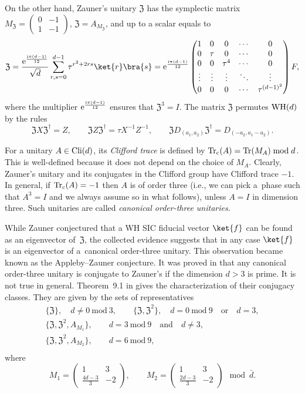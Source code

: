 \documentclass[pdftex]{sigma}
\numberwithin{equation}{section}
\newcommand{\mmod}{\mathrm{~mod~}}
\newcommand{\bmp}{\begin{pmatrix}}
\newcommand{\emp}{\end{pmatrix}}
\DeclareMathOperator{\tr}{Tr}
\begin{document}
On the other hand, Zauner's unitary $\mathfrak{Z}$ has the symplectic matrix
$M_\mathfrak{Z} = \left(\begin{smallmatrix} 0 & -1 \\ 1 & -1 \end{smallmatrix}\right)$, $\mathfrak{Z} = A_{M_\mathfrak{Z}}$,
and up to a scalar equals to
\[
\mathfrak{Z} = \frac{{\rm e}^{\frac{{\rm i}\pi (d-1)}{12}}}{\sqrt{d}} \sum_{r,s=0}^{d-1} \tau^{r^2+2rs}\ket{r}\bra{s}
= {\rm e}^{\frac{{\rm i}\pi (d-1)}{12}}\bmp
1 & 0 & 0 & \cdots & 0\\
0 & \tau & 0 & \cdots & 0\\
0 & 0 & \tau^4 & \cdots & 0\\
\vdots & \vdots & \vdots & \ddots & \vdots\\
0 & 0 & 0 & \cdots & \tau^{(d-1)^2}\\
\emp F,
\]
where the multiplier ${\rm e}^{\frac{{\rm i}\pi (d-1)}{12}}$ ensures that $\mathfrak{Z}^3 = I$.
The matrix $\mathfrak{Z}$ permutes ${\rm WH}(d)$ by the rules
\[
\mathfrak{Z}X\mathfrak{Z}^\dag = Z,
\qquad
\mathfrak{Z}Z\mathfrak{Z}^\dag = \tau X^{-1}Z^{-1},
\qquad
\mathfrak{Z}D_{(a_1, a_2)}\mathfrak{Z}^\dag = D_{(-a_2, a_1-a_2)}.
\]

For a unitary $A \in {\rm Cli}(d)$, its \textit{Clifford trace} is defined by
$\tr_{{\rm c}}(A) =\tr(M_A) \bmod d$.
This is well-defined because it does not depend on the choice of $M_A$.
Clearly, Zauner's unitary and its conjugates in the Clifford group have Clifford trace $-1$.
In general, if $\tr_{{\rm c}}(A)=-1$ then $A$ is of order three
(i.e., we can pick a~phase such that $A^3=I$
and we always assume so in what follows),
unless $A=I$ in dimension three. Such unitaries are called \textit{canonical order-three unitaries}.

While Zauner conjectured that a WH SIC fiducial vector $\ket{f}$ can be
found as an eigenvector of~$\mathfrak{Z}$, the collected evidence suggests
that in any case $\ket{f}$ is an eigenvector of a~canonical order-three unitary.
This observation became known as the Appleby--Zauner conjecture.
It was proved in \cite{Fla} that any canonical order-three unitary is conjugate
to Zauner's if the dimension $d>3$ is prime. It is not true in general.
Theorem~9.1 in \cite{BosWal}
gives the characterization of their conjugacy classes. They are given by the sets of
representatives
\begin{gather*}
 \{\mathfrak{Z}\}, \quad d\neq0 \mmod 3, \qquad
 \bigl\{\mathfrak{Z}, \mathfrak{Z}^2\bigr\}, \quad d=0 \mmod 9 \quad\text{or} \quad d=3, \\
 \bigl\{\mathfrak{Z}, \mathfrak{Z}^2, A_{M_1}\bigr\}, \qquad d=3\mmod 9 \quad\text{and}\quad d \neq 3, \\
 \bigl\{\mathfrak{Z}, \mathfrak{Z}^2, A_{M_2}\bigr\}, \qquad d=6\mmod 9, \\
\end{gather*}
where
\[
M_1 = \bmp 1 & 3 \\ \frac{4d-3}{3} & -2 \emp,
\qquad
M_2 = \bmp 1 & 3 \\ \frac{2d-3}{3} & -2 \emp \mod \bar{d}.
\]
\end{document}
